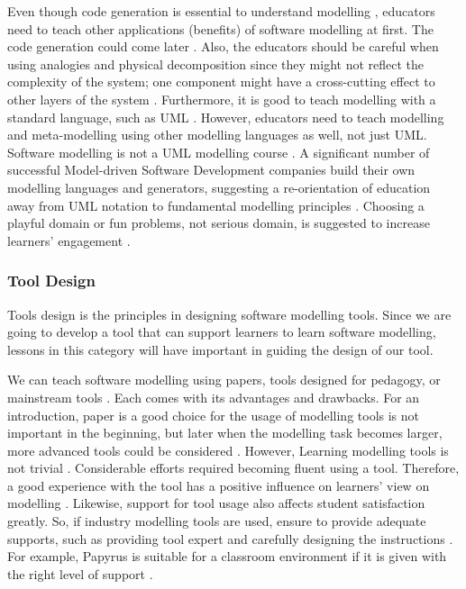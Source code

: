 \documentclass[12pt, a4paper]{report}
\begin{document}
{Even though code generation is essential to understand modelling \cite{liebel2015ready}, educators need to teach other applications (benefits) of software modelling at first. The code generation could come later \cite{paige2014bad}. Also, the educators should be careful when using analogies and physical decomposition since they might not reflect the complexity of the system; one component might have a cross-cutting effect to other layers of the system \cite{paige2014bad}. Furthermore, it is good to teach modelling with a standard language, such as UML \cite{bezivin2009teaching}. However, educators need to teach modelling and meta-modelling using other modelling languages as well, not just UML. Software modelling is not a UML modelling course \cite{paige2014bad}. A significant number of successful Model-driven Software Development companies build their own modelling languages and generators, suggesting a re-orientation of education away from UML notation to fundamental modelling principles \cite{whittle2013industrial}. Choosing a playful domain or fun problems, not serious domain, is suggested to increase learners' engagement \cite{paige2014bad}.

\subsubsection{Tool Design}
Tools design is the principles in designing software modelling tools. Since we are going to develop a tool that can support learners to learn software modelling, lessons in this category will have important in guiding the design of our tool. 

We can teach software modelling using papers, tools designed for pedagogy, or mainstream tools \cite{Akayama2013}. Each comes with its advantages and drawbacks. For an introduction, paper is a good choice for the usage of modelling tools is not important in the beginning, but later when the modelling task becomes larger, more advanced tools could be considered \cite{bezivin2009teaching}. However, Learning modelling tools is not trivial \cite{paige2014bad}. Considerable efforts required becoming fluent using a tool. Therefore, a good experience with the tool has a positive inﬂuence on learners' view on modelling \cite{liebel2015ready}. Likewise, support for tool usage also affects student satisfaction greatly. So, if industry modelling tools are used, ensure to provide adequate supports, such as providing tool expert and carefully designing the instructions \cite{liebel2015ready}. For example, Papyrus is suitable for a classroom environment if it is given with the right level of support \cite{liebel2015ready}.

}
\end{document}
